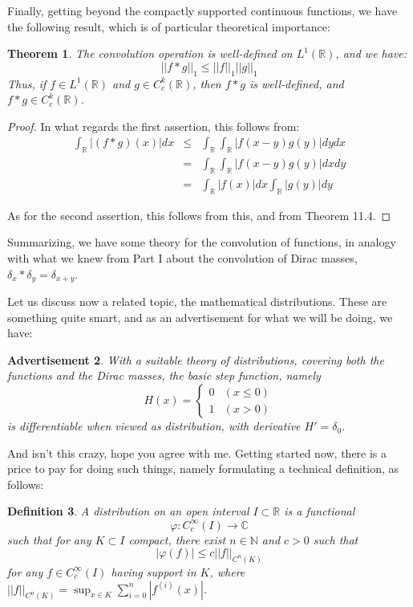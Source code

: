 \documentclass[12pt]{amsbook}
\newtheorem{theorem}{Theorem}[chapter]
\newtheorem{advertisement}[theorem]{Advertisement}
\newtheorem{definition}[theorem]{Definition}
\begin{document}
Finally, getting beyond the compactly supported continuous functions, we have the following result, which is of particular theoretical importance:

\begin{theorem}
The convolution operation is well-defined on $L^1(\mathbb R)$, and we have:
$$||f*g||_1\leq||f||_1||g||_1$$
Thus, if $f\in L^1(\mathbb R)$ and $g\in C_c^k(\mathbb R)$, then $f*g$ is well-defined, and $f*g\in C_c^k(\mathbb R)$.
\end{theorem}

\begin{proof}
In what regards the first assertion, this follows from:
\begin{eqnarray*}
\int_\mathbb R|(f*g)(x)|dx
&\leq&\int_\mathbb R\int_\mathbb R|f(x-y)g(y)|dydx\\
&=&\int_\mathbb R\int_\mathbb R|f(x-y)g(y)|dxdy\\
&=&\int_\mathbb R|f(x)|dx\int_\mathbb R|g(y)|dy
\end{eqnarray*}

As for the second assertion, this follows from this, and from Theorem 11.4.
\end{proof}

Summarizing, we have some theory for the convolution of functions, in analogy with what we knew from Part I about the convolution of Dirac masses, $\delta_x*\delta_y=\delta_{x+y}$.

\bigskip

Let us discuss now a related topic, the mathematical distributions. These are something quite smart, and as an advertisement for what we will be doing, we have:

\begin{advertisement}
With a suitable theory of distributions, covering both the functions and the Dirac masses, the basic step function, namely
$$H(x)=\begin{cases}
0&(x\leq0)\\
1&(x>0)
\end{cases}$$
is differentiable when viewed as distribution, with derivative $H'=\delta_0$.
\end{advertisement}

And isn't this crazy, hope you agree with me. Getting started now, there is a price to pay for doing such things, namely formulating a technical definition, as follows:


\begin{definition}
A distribution on an open interval $I\subset\mathbb R$ is a functional
$$\varphi:C_c^\infty(I)\to\mathbb C$$
such that for any $K\subset I$ compact, there exist $n\in\mathbb N$ and $c>0$ such that
$$|\varphi(f)|\leq c||f||_{C^n(K)}$$
for any $f\in C_c^\infty(I)$ having support in $K$, where $||f||_{C^n(K)}=\sup_{x\in K}\sum_{i=0}^n|f^{(i)}(x)|$.
\end{definition}
\end{document}
